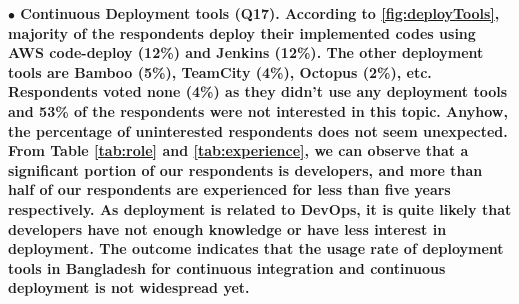 \nd\bf{$\bullet$ Continuous Deployment tools (Q17).} According to \ref{fig:deployTools},
majority of the respondents deploy their implemented codes using AWS code-deploy
(12\%) and Jenkins (12\%). The other deployment tools are Bamboo (5\%), TeamCity
(4\%), Octopus (2\%), etc. Respondents voted none (4\%) as they didn't use any
deployment tools and 53\% of the respondents were not interested in this topic.
Anyhow, the percentage of uninterested respondents does not seem unexpected.
From Table \ref{tab:role} and \ref{tab:experience}, we can observe that a
significant portion of our respondents is developers, and more than half of our
respondents are experienced for less than five years respectively. As deployment
is related to DevOps, it is quite likely that developers have not enough
knowledge or have less interest in deployment. 
The outcome indicates that the usage rate of
deployment tools in Bangladesh for continuous integration and continuous
deployment is not widespread yet. 

